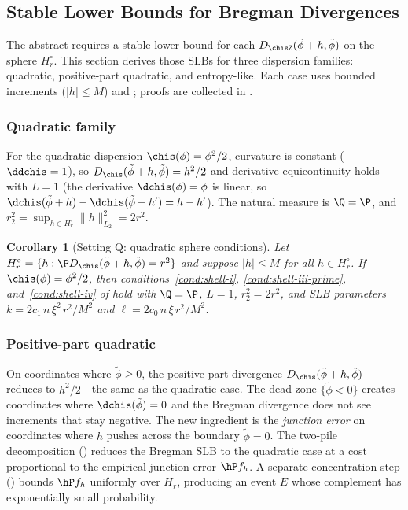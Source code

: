 \documentclass{article}
\newtheorem{corollary}[theorem]{Corollary}
\newcommand{\setupvariants}{%
  \stepcounter{theorem}%
  \xdef\variantbase{\arabic{theorem}}%
  \addtocounter{theorem}{-1}%
}
\newcommand{\theoremvariant}[1]{%
  \setcounter{theorem}{\numexpr\variantbase-1\relax}%
  \renewcommand{\thetheorem}{\thesection.\variantbase\textup{#1}}%
}
\newcommand{\resettheorem}{%
  \renewcommand{\thetheorem}{\thesection.\arabic{theorem}}%
}
\begin{document}
\subsection{Stable Lower Bounds for Bregman Divergences}

The abstract  requires
a stable lower bound for each $D_{\chisZ}(\tilde\phi+h,\tilde\phi)$
on the sphere $H_r^\circ$.
This section derives those SLBs
for three dispersion families:
quadratic, positive-part quadratic, and entropy-like.
Each case uses bounded increments ($|h| \le M$)
and ;
proofs are collected in .

\subsubsection{Quadratic family}

\setupvariants

For the quadratic dispersion $\chis(\phi) = \phi^2/2$,
curvature is constant ($\ddchis = 1$),
so $D_{\chis}(\tilde\phi+h,\tilde\phi) = h^2/2$
and derivative equicontinuity holds with $L = 1$
(the derivative $\dchis(\phi) = \phi$ is linear,
so $\dchis(\tilde\phi + h) - \dchis(\tilde\phi + h') = h - h'$).
The natural measure is $\Q = \P$,
and $r_2^2 = \sup_{h \in H_r^\circ} \|h\|_{L_2}^2 = 2r^2$.

\theoremvariant{Q}
\begin{corollary}[Setting Q: quadratic sphere conditions]
\label{cor:ulb-quadratic}
Let $H_r^\circ = \{h : \P D_{\chis}(\tilde\phi+h,\tilde\phi) = r^2\}$
and suppose $|h| \le M$ for all $h \in H_r^\circ$.
If $\chis(\phi) = \phi^2/2$,
then conditions~\ref{cond:shell-i}, \ref{cond:shell-iii-prime},
and~\ref{cond:shell-iv}
of 
hold with $\Q = \P$, $L = 1$, $r_2^2 = 2r^2$,
and SLB parameters
$k = 2c_1\, n\, \xi^2\, r^2/M^2$
and $\ell = 2c_0\, n\, \xi\, r^2/M^2$.
\end{corollary}
\resettheorem

\subsubsection{Positive-part quadratic}

On coordinates where $\tilde\phi \ge 0$,
the positive-part divergence
$D_{\chis}(\tilde\phi+h,\tilde\phi)$
reduces to $h^2/2$---the same as the quadratic case.
The dead zone $\{\tilde\phi < 0\}$ creates coordinates
where $\dchis(\tilde\phi) = 0$
and the Bregman divergence does not see
increments that stay negative.
The new ingredient is the \emph{junction error}
on coordinates where $h$ pushes across
the boundary $\tilde\phi = 0$.
The two-pile decomposition ()
reduces the Bregman SLB
to the quadratic case
at a cost proportional
to the empirical junction error $\hP f_h$.
A separate concentration step
()
bounds $\hP f_h$ uniformly over $H_r$,
producing an event $E$
whose complement has exponentially small probability.
\end{document}
